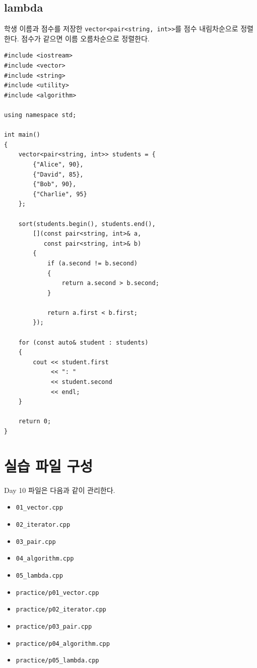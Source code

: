 \documentclass[11pt,a4paper]{article}
\begin{document}
\subsection{lambda}
\begin{practicebox}
학생 이름과 점수를 저장한 \texttt{vector<pair<string, int>>}를 점수 내림차순으로 정렬한다. 점수가 같으면 이름 오름차순으로 정렬한다.
\end{practicebox}

\begin{lstlisting}
#include <iostream>
#include <vector>
#include <string>
#include <utility>
#include <algorithm>

using namespace std;

int main()
{
    vector<pair<string, int>> students = {
        {"Alice", 90},
        {"David", 85},
        {"Bob", 90},
        {"Charlie", 95}
    };

    sort(students.begin(), students.end(),
        [](const pair<string, int>& a,
           const pair<string, int>& b)
        {
            if (a.second != b.second)
            {
                return a.second > b.second;
            }

            return a.first < b.first;
        });

    for (const auto& student : students)
    {
        cout << student.first
             << ": "
             << student.second
             << endl;
    }

    return 0;
}
\end{lstlisting}

\section{실습 파일 구성}
\begin{practicebox}
Day 10 파일은 다음과 같이 관리한다.
\begin{itemize}[leftmargin=1.5em]
    \item \texttt{01\_vector.cpp}
    \item \texttt{02\_iterator.cpp}
    \item \texttt{03\_pair.cpp}
    \item \texttt{04\_algorithm.cpp}
    \item \texttt{05\_lambda.cpp}
    \item \texttt{practice/p01\_vector.cpp}
    \item \texttt{practice/p02\_iterator.cpp}
    \item \texttt{practice/p03\_pair.cpp}
    \item \texttt{practice/p04\_algorithm.cpp}
    \item \texttt{practice/p05\_lambda.cpp}
\end{itemize}
\end{practicebox}
\end{document}
